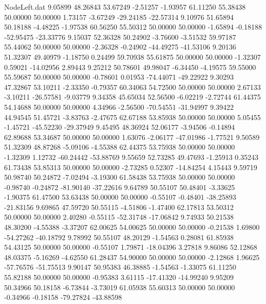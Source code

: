 \begin{filecontents}{NodeLeft.dat}
   9.05899   48.26843   53.67249    -2.51257   -1.93957   61.11250   55.38438   50.00000   50.00000    1.73157   -3.67249  -29.24185  -22.57314
   9.10976   51.65894   50.18188    -4.48225   -1.97538   60.56250   55.50312   50.00000   50.00000   -1.65894   -0.18188  -52.95475  -23.33776
   9.15037   52.36328   50.24902    -3.76600   -3.51532   59.97187   55.44062   50.00000   50.00000   -2.36328   -0.24902  -44.49275  -41.53106
   9.20136   51.32307   49.40979    -1.18750    0.24499   59.70938   55.61875   50.00000   50.00000   -1.32307    0.59021  -14.02956    2.89443
   9.25212   50.78601   49.98047    -6.34450   -4.19575   59.55000   55.59687   50.00000   50.00000   -0.78601    0.01953  -74.44071  -49.22922
   9.30293   47.32867   53.10211    -2.33350   -0.79357   60.34063   54.72500   50.00000   50.00000    2.67133   -3.10211  -26.57581   -9.03779
   9.34358   45.65034   52.56500    -6.02219   -2.72744   61.44375   54.14688   50.00000   50.00000    4.34966   -2.56500  -70.54551  -31.94997
   9.39422   44.94545   51.45721    -3.83763   -2.47675   62.67188   53.85938   50.00000   50.00000    5.05455   -1.45721  -45.52230  -29.37949
   9.45495   48.36924   52.06177    -3.94506   -0.14894   62.89688   53.34687   50.00000   50.00000    1.63076   -2.06177  -47.01986   -1.77521
   9.50589   51.32309   48.87268    -5.09106   -4.55388   62.44375   53.75938   50.00000   50.00000   -1.32309    1.12732  -60.24442  -53.88769
   9.55659   52.73285   49.47693    -1.25913    0.35243   61.73438   53.85313   50.00000   50.00000   -2.73285    0.52307  -14.84254    4.15443
   9.59719   50.98740   50.24872    -7.02494   -3.19300   61.58438   53.75938   50.00000   50.00000   -0.98740   -0.24872  -81.90140  -37.22616
   9.64789   50.55107   50.48401    -3.33625   -1.90375   61.47500   53.63438   50.00000   50.00000   -0.55107   -0.48401  -38.25893  -21.83156
   9.69865   47.59720   50.55115    -4.51806   -1.47400   62.17813   53.50312   50.00000   50.00000    2.40280   -0.55115  -52.31748  -17.06842
   9.74933   50.21538   48.30200    -4.55388   -3.37207   62.00625   54.00625   50.00000   50.00000   -0.21538    1.69800  -54.27262  -40.18792
   9.78992   50.55107   48.20129    -1.54563    0.28081   61.85938   54.43125   50.00000   50.00000   -0.55107    1.79871  -18.04396    3.27818
   9.86086   52.12868   48.03375    -5.16269   -4.62550   61.28437   54.90000   50.00000   50.00000   -2.12868    1.96625  -57.76576  -51.75513
   9.90147   50.95383   46.38885    -1.54563   -1.33075   61.11250   55.82188   50.00000   50.00000   -0.95383    3.61115  -17.41320  -14.99240
   9.95209   50.34966   50.18158    -6.73844   -3.73019   61.05938   55.60313   50.00000   50.00000   -0.34966   -0.18158  -79.27824  -43.88598

\end{filecontents}
